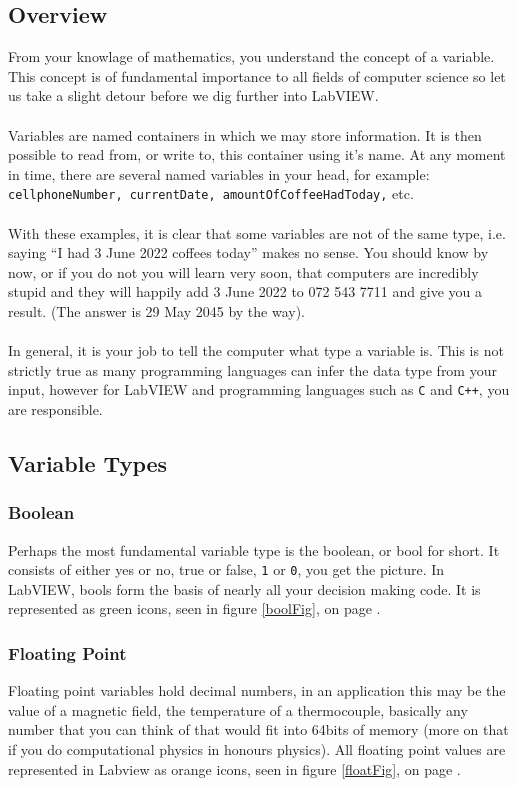 	\subsection{Overview}
	From your knowlage of mathematics, you understand the concept of a variable. This concept is of fundamental importance to all fields of computer science so let us take a slight detour before we dig further into LabVIEW.\\
	\\
	Variables are named containers in which we may store information. It is then possible to read from, or write to, this container using it's name. At any moment in time, there are several named variables in your head, for example: \texttt{cellphoneNumber, currentDate, amountOfCoffeeHadToday,} etc.\\
	\\
	With these examples, it is clear that some variables are not of the same type, i.e. saying ``I had 3 June 2022 coffees today'' makes no sense. You should know by now, or if you do not you will learn very soon, that computers are incredibly stupid and they will happily add 3 June 2022 to 072 543 7711 and give you a result. (The answer is 29 May 2045 by the way).\\
	\\
	In general, it is your job to tell the computer what type a variable is. This is not strictly true as many programming languages can infer the data type from your input, however for LabVIEW and programming languages such as \texttt{C} and \texttt{C++}, you are responsible.
	\subsection{Variable Types}
	\subsubsection{Boolean}
	Perhaps the most fundamental variable type is the boolean, or bool for short. It consists of either yes or no, true or false, \texttt{1} or \texttt{0}, you get the picture. In LabVIEW, bools form the basis of nearly all your decision making code. It is represented as green icons, seen in figure \ref{boolFig}, on page \pageref{boolfig}.
	\subsubsection{Floating Point}
	Floating point variables hold decimal numbers, in an application this may be the value of a magnetic field, the temperature of a thermocouple, basically any number that you can think of that would fit into 64bits of memory (more on that if you do computational physics in honours physics). All floating point values are represented in Labview as orange icons, seen in figure \ref{floatFig}, on page \pageref{floatFig}.
